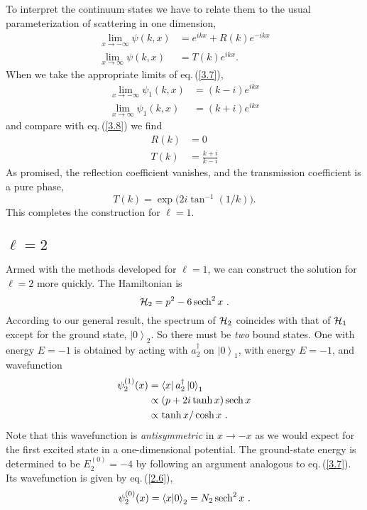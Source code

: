 \documentclass[12pt,twoside]{article}
\newcommand{\sech}{\mathop{\rm sech}\nolimits}
\newcommand{\bra}[1]{\left\langle #1 \right|}
\newcommand{\ket}[1]{\left|#1\right\rangle}
\newcommand{\braket}[2]{\left\langle#1 |  #2\right\rangle}
\begin{document}
To interpret the continuum states we have to relate them to the usual parameterization of scattering in one dimension,
%
\begin{align}
  \lim_{x\to -\infty}\psi(k,x) &=  e^{ikx} + R(k)e^{-ikx}\nonumber\\
  \lim_{x\to \infty}\psi(k,x) &=  T(k) e^{ikx} .
  \label{3.8}
\end{align}
%
When we take the appropriate limits of eq.\,(\ref{3.7}),
%
\begin{align}
  \lim_{x\to -\infty}\psi_1(k,x) &=  (k-i)e^{ikx}\nonumber\\
  \lim_{x\to \infty}\psi_1(k,x) &=  (k+i)e^{ikx}   \label{3.9}
\end{align}
%
and compare with eq.\,(\ref{3.8}) we find
%
\begin{align}
  R(k)&= 0\nonumber\\
  T(k)&= \frac{k+i}{k-i}   \label{3.10}
\end{align}
As promised, the reflection coefficient vanishes, and the transmission coefficient is a pure phase,
%
\begin{equation}
  T(k) = \exp \bigl(2i\tan^{-1}(1/k)\bigr).
  \label{3.11}
\end{equation}
%
This completes the construction for $\ell=1$.

\subsection{\protect\boldmath$\ell=2$}

\noindent
Armed with the methods developed for $\ell=1$, we can construct the solution for $\ell=2$ more quickly.  The Hamiltonian is
%
\begin{equation}
  {\cal H }_2 = p^2 - 6\sech^2x\ .
  \label{3.12}
\end{equation}
%
According to our general result, the spectrum of ${\cal H }_2$ coincides with that of ${\cal H }_1$ except for the ground state, $\ket0_2$.  So there must be \emph{two} bound states.  One with energy $E=-1$ is obtained by acting with $a_2^\dagger $ on $\ket0_1$, with energy $E=-1$, and wavefunction %
\begin{align}
  \psi_2^{(1)}(x) &=  \bra x     a_2^\dagger  \ket0_1\nonumber\\
  &\propto  (p+2i\tanh x)\sech x\nonumber\\
  &\propto  \tanh x/\cosh x\ .
  \label{3.13}
\end{align}
%
Note that this wavefunction is \emph{antisymmetric} in $x\rightarrow -x$ as we would expect for the first excited state in a one-dimensional potential.  The ground-state energy is determined to be $E_2^{(0)} = -4$ by following an argument analogous to eq.\,(\ref{3.7}).  Its wavefunction is given by eq.\,(\ref{2.6}), %
\begin{equation}
  \psi_2^{(0)}(x) = \braket x0_2 = N_2 \sech^2x\ .
  \label{3.14}
\end{equation}
\end{document}
